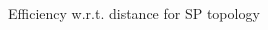 
\begin{figure}[h]
\centering
\begin{subfigmatrix}{2} 
\end{subfigmatrix}
\end{figure}
\begin{figure}[H]
\centering
\begin{subfigmatrix}{1} 
\end{subfigmatrix}
\caption{Efficiency w.r.t. distance for SP topology}
\end{figure}

